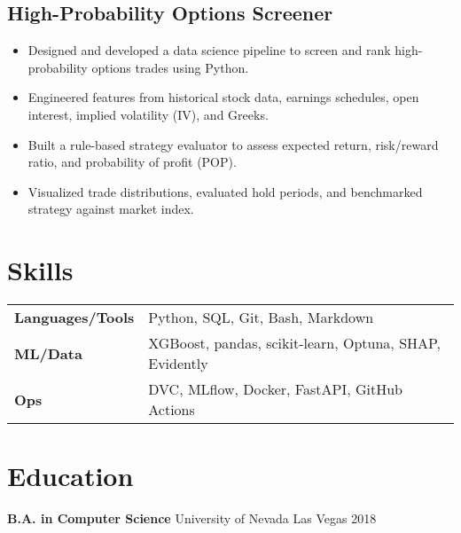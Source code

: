 \documentclass[a4paper,10pt]{article}
\begin{document}
\subsection*{High-Probability Options Screener}
\begin{itemize}[leftmargin=*, itemsep=2pt, parsep=0pt]
    \item Designed and developed a data science pipeline to screen and rank high-probability options trades using Python.
    \item Engineered features from historical stock data, earnings schedules, open interest, implied volatility (IV), and Greeks.
    \item Built a rule-based strategy evaluator to assess expected return, risk/reward ratio, and probability of profit (POP).
    \item Visualized trade distributions, evaluated hold periods, and benchmarked strategy against market index.
\end{itemize}

\section*{Skills}
\begin{tabular}{p{} p{}}
\textbf{Languages/Tools} & Python, SQL, Git, Bash, Markdown \\
\textbf{ML/Data} & XGBoost, pandas, scikit-learn, Optuna, SHAP, Evidently \\
\textbf{Ops} & DVC, MLflow, Docker, FastAPI, GitHub Actions \\
\end{tabular}


\section*{Education}

\textbf{B.A. in Computer Science} \hfill University of Nevada Las Vegas \hfill 2018
\end{document}
